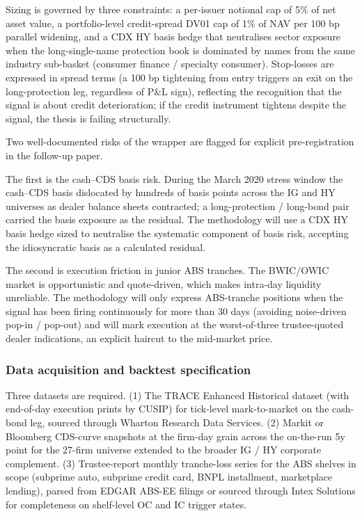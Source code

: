 \documentclass[11pt,a4paper]{article}
\begin{document}
Sizing is governed by three constraints: a per-issuer notional cap of 5\% of net asset value, a portfolio-level credit-spread DV01 cap of 1\% of NAV per 100 bp parallel widening, and a CDX HY basis hedge that neutralises sector exposure when the long-single-name protection book is dominated by names from the same industry sub-basket (consumer finance / specialty consumer). Stop-losses are expressed in spread terms (a 100 bp tightening from entry triggers an exit on the long-protection leg, regardless of P\&L sign), reflecting the recognition that the signal is about credit deterioration; if the credit instrument tightens despite the signal, the thesis is failing structurally.

Two well-documented risks of the wrapper are flagged for explicit pre-registration in the follow-up paper.

The first is the cash--CDS basis risk. During the March 2020 stress window the cash--CDS basis dislocated by hundreds of basis points across the IG and HY universes as dealer balance sheets contracted; a long-protection / long-bond pair carried the basis exposure as the residual. The methodology will use a CDX HY basis hedge sized to neutralise the systematic component of basis risk, accepting the idiosyncratic basis as a calculated residual.

The second is execution friction in junior ABS tranches. The BWIC/OWIC market is opportunistic and quote-driven, which makes intra-day liquidity unreliable. The methodology will only express ABS-tranche positions when the signal has been firing continuously for more than 30 days (avoiding noise-driven pop-in / pop-out) and will mark execution at the worst-of-three trustee-quoted dealer indications, an explicit haircut to the mid-market price.

\subsubsection{Data acquisition and backtest specification}

Three datasets are required. (1) The TRACE Enhanced Historical dataset (with end-of-day execution prints by CUSIP) for tick-level mark-to-market on the cash-bond leg, sourced through Wharton Research Data Services. (2) Markit or Bloomberg CDS-curve snapshots at the firm-day grain across the on-the-run 5y point for the 27-firm universe extended to the broader IG / HY corporate complement. (3) Trustee-report monthly tranche-loss series for the ABS shelves in scope (subprime auto, subprime credit card, BNPL installment, marketplace lending), parsed from EDGAR ABS-EE filings or sourced through Intex Solutions for completeness on shelf-level OC and IC trigger states.
\end{document}
